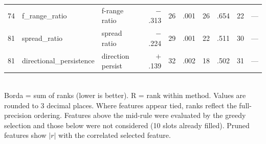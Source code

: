 \begin{table}[p]
\begin{tabular}{@{}rllrrrrrrl@{}}
74 & f\_range\_ratio               & f-range ratio & $-$.313 & 26 & .001 & 26 & .654 & 22 & --- \\
81 & spread\_ratio                 & spread ratio & $-$.224 & 29 & .001 & 22 & .511 & 30 & --- \\
81 & directional\_persistence      & direction persist & $+$.139 & 32 & .002 & 18 & .502 & 31 & --- \\
\bottomrule
\end{tabular}
\\[0.3em]
{\scriptsize Borda = sum of ranks (lower is better). R = rank within method. Values are rounded to 3 decimal places. Where features appear tied, ranks reflect the full-precision ordering. Features above the mid-rule were evaluated by the greedy selection and those below were not considered (10 slots already filled). Pruned features show $|r|$ with the correlated selected feature.}
\end{table}

